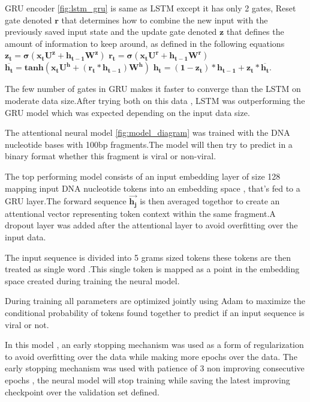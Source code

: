 \documentclass[conference]{IEEEtran}
\begin{document}
GRU encoder \ref{fig:lstm_gru} is same as LSTM except it has only 2 gates, Reset gate denoted $\mathbf{r}$ that determines how to combine the new input with the previously saved input state and the update gate denoted $\mathbf{z}$ that defines the amount of information to keep around, as defined  in the following equations \newline
$\mathbf{z_{t}=\sigma(x_{t}U^z + h_{t-1}W^z)}$ \newline
$\mathbf{r_{t}=\sigma(x_{t}U^r + h_{t-1}W^r)}$ \newline
$\mathbf{\overline{h_{t}} = tanh(x_{t}U^h + (r_{t} * h_{t-1})W^h )}$ \newline
$\mathbf{ h_{t} = (1-z_{t})*h_{t-1} +z_{t}*\overline{h_{t}}}$.

The few number of gates in GRU makes it faster to converge than the LSTM on moderate data size.After trying both on this data , LSTM was outperforming the GRU model which was expected depending on the input data size.
 
 The attentional neural model \ref{fig:model_diagram} was trained with the DNA nucleotide bases with 100bp fragments.The model will then try to predict in a binary format whether this fragment is viral or non-viral.
 
The top performing model consists of an input embedding layer of size 128 mapping input DNA nucleotide tokens into an embedding space , that's fed to a GRU layer.The forward sequence $\mathbf{\overrightarrow{h_{j}}}$ is then averaged togethor to create an attentional vector representing token context within the same fragment.A dropout layer was added after the attentional layer to avoid overfitting over the input data.

The input sequence is divided into 5 grams sized tokens these tokens are then treated as single word .This single token is mapped as a point in the embedding space created during training the neural model.

During training all parameters are optimized jointly using Adam to maximize the conditional probability of tokens found together to predict if an input sequence is viral or not.

 In this model , an early stopping mechanism was used as a form of regularization to avoid overfitting over the data while making more epochs over the data. The early stopping mechanism was used with patience of 3 non  improving consecutive epochs , the neural model will stop training while saving the latest improving checkpoint over the validation set defined. 
\end{document}
